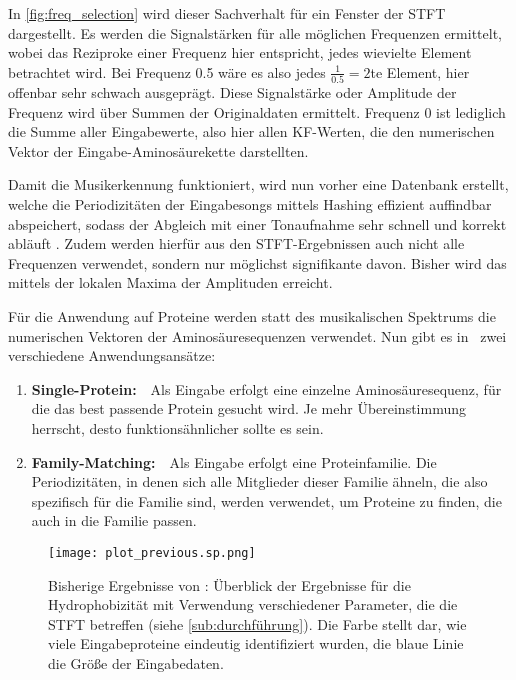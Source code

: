     In \autoref{fig:freq_selection} wird dieser Sachverhalt für ein Fenster der \ac{STFT} dargestellt. Es werden die Signalstärken für alle möglichen Frequenzen ermittelt, wobei das Reziproke einer Frequenz hier entspricht, jedes wievielte Element betrachtet wird. Bei Frequenz 0.5 wäre es also jedes $\frac{1}{0.5} = 2$te Element, hier offenbar sehr schwach ausgeprägt. Diese Signalstärke oder Amplitude der Frequenz wird über Summen der Originaldaten ermittelt. Frequenz 0 ist lediglich die Summe aller Eingabewerte, also hier allen \ac{KF}-Werten, die den numerischen Vektor der Eingabe-Aminosäurekette darstellten.

    Damit die Musikerkennung funktioniert, wird nun vorher eine Datenbank erstellt, welche die Periodizitäten der Eingabesongs mittels Hashing effizient auffindbar abspeichert, sodass der Abgleich mit einer Tonaufnahme sehr schnell und korrekt abläuft . Zudem werden hierfür aus den \ac{STFT}-Ergebnissen auch nicht alle Frequenzen verwendet, sondern nur möglichst signifikante davon. Bisher wird das mittels der lokalen Maxima der Amplituden erreicht.

    Für die Anwendung auf Proteine werden statt des musikalischen Spektrums die numerischen Vektoren der Aminosäuresequenzen verwendet. Nun gibt es in \protfin\ zwei verschiedene Anwendungsansätze:
    \begin{enumerate}
        \item \textbf{Single-Protein:}\ \ Als Eingabe erfolgt eine einzelne Aminosäuresequenz, für die das best passende Protein gesucht wird. Je mehr Übereinstimmung herrscht, desto funktionsähnlicher sollte es sein.
        \item \textbf{Family-Matching:}\ \ Als Eingabe erfolgt eine Proteinfamilie. Die Periodizitäten, in denen sich alle Mitglieder dieser Familie ähneln, die also spezifisch für die Familie sind, werden verwendet, um Proteine zu finden, die auch in die Familie passen.
    \end{enumerate}
    \label{kurze_sequenzen}

    \begin{wrapfigure}{r}{0.5\textwidth}
        \texttt{[image: plot\_previous.sp.png]}
        \caption[Bisherige Ergebnisse von \protfin]{Bisherige Ergebnisse von \protfin: Überblick der Ergebnisse für die Hydrophobizität mit Verwendung verschiedener Parameter, die die \acs{STFT} betreffen (siehe \autoref{sub:durchführung}). Die Farbe stellt dar, wie viele Eingabeproteine eindeutig identifiziert wurden, die blaue Linie die Größe der Eingabedaten.}
        \label{fig:prev_results}
    \end{wrapfigure}

